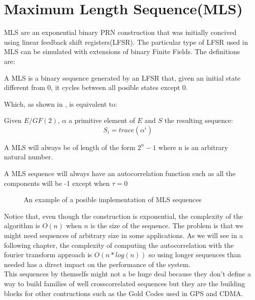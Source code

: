 \section{Maximum Length Sequence(MLS)}

MLS are an exponential binary PRN construction that was initially concived
using linear feedback shift registers(LFSR). The particular type of LFSR used
in MLS can be simulated with extensions of binary Finite Fields. The
definitions are:

\begin{definition}[LFSR]
  A MLS is a binary sequence generated by an LFSR that, given an initial state
  different from 0, it cycles between all posible states except 0.
\end{definition}

Which, as shown in \citet{golomb_ref}, is equivalent to:

\begin{definition}
  Given $E/GF(2)$, $\alpha$ a primitive element of $E$ and $S$ the resulting
  sequence:
  \begin{equation}
    S_{i} = trace(\alpha^{i})
  \end{equation}
\end{definition}

\begin{property}
  A MLS will always be of length of the form $2^{n}-1$ where n is an arbitrary
  natural number.
\end{property}

\begin{property}
  A MLS sequence will always have an autocorrelation function such as all the
  components will be -1 except when $\tau = 0$
\end{property}

\begin{figure}[ht!]
  \caption{An example of a posible implementation of MLS sequences}
  \label{mls:fig:1}
\end{figure}

Notice that, even though the construction is exponential, the complexity of
the algorithm is $O(n)$ when $n$ is the size of the sequence. The problem is
that we might need sequences of arbitrary size in some applications. As we will
see in a following chapter, the complexity of computing the autocorrelation
with the fourier transform approach is $O(n*log(n))$ so using longer sequences
than needed has a direct impact on the performance of the system. \\

This sequences by themselfs might not a be huge deal because they don't define
a way to build families of well crosscorrelated sequences but they are the
building blocks for other contructions such as the Gold Codes used in GPS and
CDMA.

